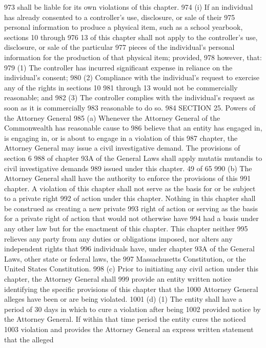 973 shall be liable for its own violations of this chapter.
974 (i) If an individual has already consented to a controller’s use, disclosure, or sale of their
975 personal information to produce a physical item, such as a school yearbook, sections 10 through
976 13 of this chapter shall not apply to the controller’s use, disclosure, or sale of the particular
977 pieces of the individual’s personal information for the production of that physical item; provided,
978 however, that:
979 (1) The controller has incurred significant expense in reliance on the individual’s consent;
980 (2) Compliance with the individual’s request to exercise any of the rights in sections 10
981 through 13 would not be commercially reasonable; and
982 (3) The controller complies with the individual’s request as soon as it is commercially
983 reasonable to do so.
984 SECTION 25. Powers of the Attorney General
985 (a) Whenever the Attorney General of the Commonwealth has reasonable cause to
986 believe that an entity has engaged in, is engaging in, or is about to engage in a violation of this
987 chapter, the Attorney General may issue a civil investigative demand. The provisions of section 6
988 of chapter 93A of the General Laws shall apply mutatis mutandis to civil investigative demands
989 issued under this chapter.
49 of 65
990 (b) The Attorney General shall have the authority to enforce the provisions of this
991 chapter. A violation of this chapter shall not serve as the basis for or be subject to a private right
992 of action under this chapter. Nothing in this chapter shall be construed as creating a new private
993 right of action or serving as the basis for a private right of action that would not otherwise have
994 had a basis under any other law but for the enactment of this chapter. This chapter neither
995 relieves any party from any duties or obligations imposed, nor alters any independent rights that
996 individuals have, under chapter 93A of the General Laws, other state or federal laws, the
997 Massachusetts Constitution, or the United States Constitution.
998 (c) Prior to initiating any civil action under this chapter, the Attorney General shall
999 provide an entity written notice identifying the specific provisions of this chapter that the
1000 Attorney General alleges have been or are being violated.
1001 (d) (1) The entity shall have a period of 30 days in which to cure a violation after being
1002 provided notice by the Attorney General. If within that time period the entity cures the noticed
1003 violation and provides the Attorney General an express written statement that the alleged
